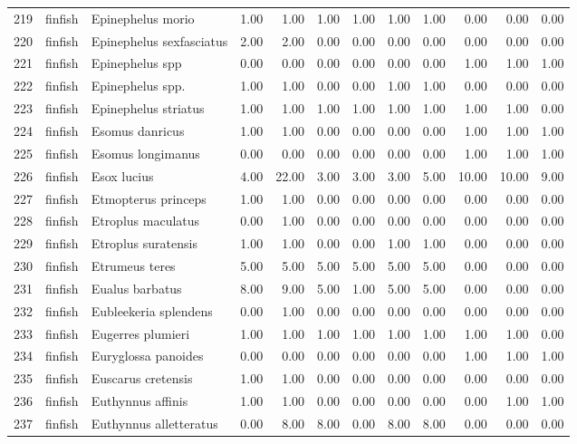 \begin{table}[ht]
\begin{tabular}{rllrrrrrrrrr}
  219 & finfish & Epinephelus morio & 1.00 & 1.00 & 1.00 & 1.00 & 1.00 & 1.00 & 0.00 & 0.00 & 0.00 \\ 
  220 & finfish & Epinephelus sexfasciatus & 2.00 & 2.00 & 0.00 & 0.00 & 0.00 & 0.00 & 0.00 & 0.00 & 0.00 \\ 
  221 & finfish & Epinephelus spp & 0.00 & 0.00 & 0.00 & 0.00 & 0.00 & 0.00 & 1.00 & 1.00 & 1.00 \\ 
  222 & finfish & Epinephelus spp. & 1.00 & 1.00 & 0.00 & 0.00 & 1.00 & 1.00 & 0.00 & 0.00 & 0.00 \\ 
  223 & finfish & Epinephelus striatus & 1.00 & 1.00 & 1.00 & 1.00 & 1.00 & 1.00 & 1.00 & 1.00 & 0.00 \\ 
  224 & finfish & Esomus danricus & 1.00 & 1.00 & 0.00 & 0.00 & 0.00 & 0.00 & 1.00 & 1.00 & 1.00 \\ 
  225 & finfish & Esomus longimanus & 0.00 & 0.00 & 0.00 & 0.00 & 0.00 & 0.00 & 1.00 & 1.00 & 1.00 \\ 
  226 & finfish & Esox lucius & 4.00 & 22.00 & 3.00 & 3.00 & 3.00 & 5.00 & 10.00 & 10.00 & 9.00 \\ 
  227 & finfish & Etmopterus princeps & 1.00 & 1.00 & 0.00 & 0.00 & 0.00 & 0.00 & 0.00 & 0.00 & 0.00 \\ 
  228 & finfish & Etroplus maculatus & 0.00 & 1.00 & 0.00 & 0.00 & 0.00 & 0.00 & 0.00 & 0.00 & 0.00 \\ 
  229 & finfish & Etroplus suratensis & 1.00 & 1.00 & 0.00 & 0.00 & 1.00 & 1.00 & 0.00 & 0.00 & 0.00 \\ 
  230 & finfish & Etrumeus teres & 5.00 & 5.00 & 5.00 & 5.00 & 5.00 & 5.00 & 0.00 & 0.00 & 0.00 \\ 
  231 & finfish & Eualus barbatus & 8.00 & 9.00 & 5.00 & 1.00 & 5.00 & 5.00 & 0.00 & 0.00 & 0.00 \\ 
  232 & finfish & Eubleekeria splendens & 0.00 & 1.00 & 0.00 & 0.00 & 0.00 & 0.00 & 0.00 & 0.00 & 0.00 \\ 
  233 & finfish & Eugerres plumieri & 1.00 & 1.00 & 1.00 & 1.00 & 1.00 & 1.00 & 1.00 & 1.00 & 0.00 \\ 
  234 & finfish & Euryglossa panoides & 0.00 & 0.00 & 0.00 & 0.00 & 0.00 & 0.00 & 1.00 & 1.00 & 1.00 \\ 
  235 & finfish & Euscarus cretensis & 1.00 & 1.00 & 0.00 & 0.00 & 0.00 & 0.00 & 0.00 & 0.00 & 0.00 \\ 
  236 & finfish & Euthynnus affinis & 1.00 & 1.00 & 0.00 & 0.00 & 0.00 & 0.00 & 0.00 & 1.00 & 1.00 \\ 
  237 & finfish & Euthynnus alletteratus & 0.00 & 8.00 & 8.00 & 0.00 & 8.00 & 8.00 & 0.00 & 0.00 & 0.00 \\ 

\end{tabular}
\end{table}
